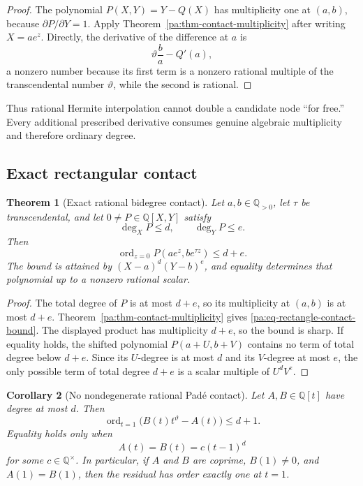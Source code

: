 \documentclass[11pt,oneside]{article}
\newtheorem{theorem}{Theorem}[section]
\newtheorem{corollary}[theorem]{Corollary}
\theoremstyle{definition}
\theoremstyle{remark}
\newcommand{\Q}{\mathbb Q}
\newcommand{\thetaq}{\vartheta}
\begin{document}
\begin{proof}
The polynomial \(P(X,Y)=Y-Q(X)\) has multiplicity one at \((a,b)\), because
\(\partial P/\partial Y=1\).  Apply Theorem~\ref{pa:thm-contact-multiplicity} after writing
\(X=ae^z\).  Directly, the derivative of the difference at \(a\) is
\[
 \thetaq\frac ba-Q'(a),
\]
a nonzero number because its first term is a nonzero rational multiple of the transcendental
number \(\thetaq\), while the second is rational.
\end{proof}

Thus rational Hermite interpolation cannot double a candidate node ``for free.''  Every
additional prescribed derivative consumes genuine algebraic multiplicity and therefore
ordinary degree.

\subsection{Exact rectangular contact}

\begin{theorem}[Exact rational bidegree contact]
\label{pa:thm-rectangle-contact}
Let \(a,b\in\Q_{>0}\), let \(\tau\) be transcendental, and let
\(0\ne P\in\Q[X,Y]\) satisfy
\[
 \deg_XP\le d,
 \qquad
 \deg_YP\le e.
\]
Then
\begin{equation}
 \operatorname{ord}_{z=0}P(ae^z,be^{\tau z})\le d+e.
 \label{pa:eq-rectangle-contact-bound}
\end{equation}
The bound is attained by \((X-a)^d(Y-b)^e\), and equality determines that polynomial up to a
nonzero rational scalar.
\end{theorem}

\begin{proof}
The total degree of \(P\) is at most \(d+e\), so its multiplicity at \((a,b)\) is at most
\(d+e\).  Theorem~\ref{pa:thm-contact-multiplicity} gives
\eqref{pa:eq-rectangle-contact-bound}.  The displayed product has multiplicity \(d+e\), so the
bound is sharp.  If equality holds, the shifted polynomial \(P(a+U,b+V)\) contains no term of
total degree below \(d+e\).  Since its \(U\)-degree is at most \(d\) and its \(V\)-degree at
most \(e\), the only possible term of total degree \(d+e\) is a scalar multiple of
\(U^dV^e\).
\end{proof}

\begin{corollary}[No nondegenerate rational Pad\'e contact]
\label{pa:cor-rational-pade}
Let \(A,B\in\Q[t]\) have degree at most \(d\).  Then
\begin{equation}
 \operatorname{ord}_{t=1}\bigl(B(t)t^{\thetaq}-A(t)\bigr)\le d+1.
 \label{pa:eq-pade-dplus1}
\end{equation}
Equality holds only when
\[
 A(t)=B(t)=c(t-1)^d
\]
for some \(c\in\Q^\times\).  In particular, if \(A\) and \(B\) are coprime,
\(B(1)\ne0\), and \(A(1)=B(1)\), then the residual has order exactly one at \(t=1\).
\end{corollary}
\end{document}
